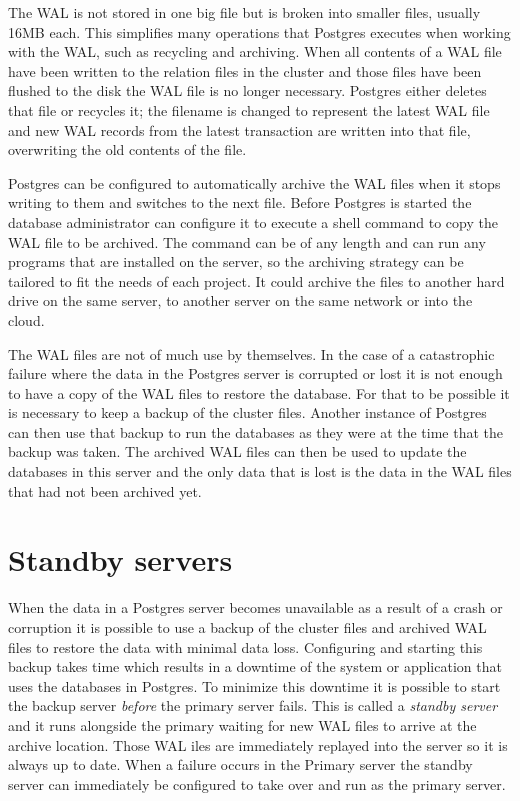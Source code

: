 \documentclass[a4paper,12pt,twoside,BCOR=10mm]{scrbook}
\begin{document}
The WAL is not stored in one big file but is broken into smaller files, usually 16MB each. This simplifies many operations that Postgres executes when working with the WAL, such as recycling and archiving. When all contents of a WAL file have been written to the relation files in the cluster and those files have been flushed to the disk the WAL file is no longer necessary. Postgres either deletes that file or recycles it; the filename is changed to represent the latest WAL file and new WAL records from the latest transaction are written into that file, overwriting the old contents of the file.

Postgres can be configured to automatically archive the WAL files when it stops writing to them and switches to the next file. Before Postgres is started the database administrator can configure it to execute a shell command to copy the WAL file to be archived. The command can be of any length and can run any programs that are installed on the server, so the archiving strategy can be tailored to fit the needs of each project. It could archive the files to another hard drive on the same server, to another server on the same network or into the cloud.

The WAL files are not of much use by themselves. In the case of a catastrophic failure where the data in the Postgres server is corrupted or lost it is not enough to have a copy of the WAL files to restore the database. For that to be possible it is necessary to keep a backup of the cluster files. Another instance of Postgres can then use that backup to run the databases as they were at the time that the backup was taken. The archived WAL files can then be used to update the databases in this server and the only data that is lost is the data in the WAL files that had not been archived yet.


\section{Standby servers}
When the data in a Postgres server becomes unavailable as a result of a crash or corruption it is possible to use a backup of the cluster files and archived WAL files to restore the data with minimal data loss. Configuring and starting this backup takes time which results in a downtime of the system or application that uses the databases in Postgres. To minimize this downtime it is possible to start the backup server \textit{before} the primary server fails. This is called a \textit{standby server} and it runs alongside the primary waiting for new WAL files to arrive at the archive location. Those WAL iles are immediately replayed into the server so it is always up to date. When a failure occurs in the Primary server the standby server can immediately be configured to take over and run as the primary server.
\end{document}
